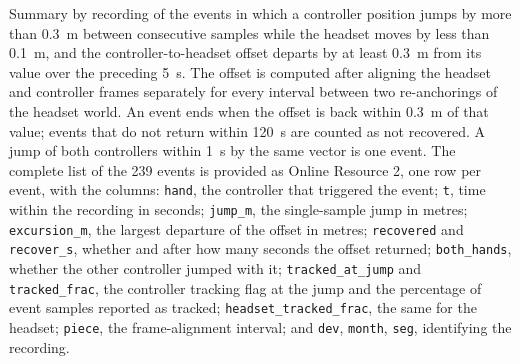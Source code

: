 \documentclass[11pt,a4paper]{article}
\begin{document}
Summary by recording of the events in which a controller position jumps by more than 0.3~m between consecutive samples while the headset moves by less than 0.1~m, and the controller-to-headset offset departs by at least 0.3~m from its value over the preceding 5~s. The offset is computed after aligning the headset and controller frames separately for every interval between two re-anchorings of the headset world. An event ends when the offset is back within 0.3~m of that value; events that do not return within 120~s are counted as not recovered. A jump of both controllers within 1~s by the same vector is one event. The complete list of the 239 events is provided as Online Resource 2, one row per event, with the columns: \texttt{hand}, the controller that triggered the event; \texttt{t}, time within the recording in seconds; \texttt{jump\_m}, the single-sample jump in metres; \texttt{excursion\_m}, the largest departure of the offset in metres; \texttt{recovered} and \texttt{recover\_s}, whether and after how many seconds the offset returned; \texttt{both\_hands}, whether the other controller jumped with it; \texttt{tracked\_at\_jump} and \texttt{tracked\_frac}, the controller tracking flag at the jump and the percentage of event samples reported as tracked; \texttt{headset\_tracked\_frac}, the same for the headset; \texttt{piece}, the frame-alignment interval; and \texttt{dev}, \texttt{month}, \texttt{seg}, identifying the recording.
\end{document}
